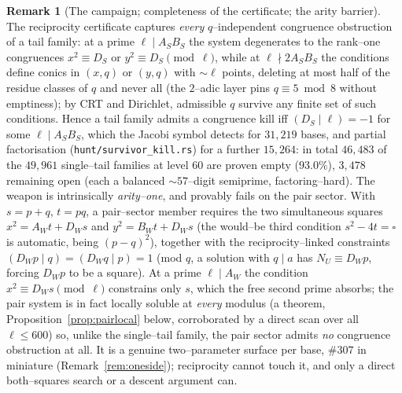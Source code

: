 \documentclass[11pt]{article}
\theoremstyle{definition}
\newtheorem{remark}[theorem]{Remark}
\begin{document}
\begin{remark}[The campaign; completeness of the certificate; the arity barrier]\label{rem:campaign}
The reciprocity certificate captures \emph{every} $q$--independent congruence obstruction of a
tail family: at a prime $\ell\mid A_SB_S$ the system degenerates to the rank--one congruences
$x^2\equiv D_S$ or $y^2\equiv D_S\pmod\ell$, while at $\ell\nmid 2A_SB_S$ the conditions define
conics in $(x,q)$ or $(y,q)$ with $\sim\ell$ points, deleting at most half of the residue classes
of $q$ and never all (the $2$--adic layer pins $q\equiv5\bmod8$ without emptiness); by CRT and
Dirichlet, admissible $q$ survive any finite set of such conditions. Hence a tail family admits a
congruence kill iff $(D_S\mid\ell)=-1$ for some $\ell\mid A_SB_S$, which the Jacobi symbol
detects for $31{,}219$ bases, and partial factorisation (\texttt{hunt/survivor\_kill.rs}) for a
further $15{,}264$: in total $46{,}483$ of the $49{,}961$ single--tail families at level $60$ are
proven empty ($93.0\%$), $3{,}478$ remaining open (each a balanced ${\sim}57$--digit semiprime, factoring--hard). The weapon is intrinsically \emph{arity--one}, and provably fails on the pair sector. With
$s=p+q$, $t=pq$, a pair--sector member requires the two simultaneous squares $x^2=A_Wt+D_Ws$ and
$y^2=B_Wt+D_Ws$ (the would--be third condition $s^2-4t=\square$ is automatic, being $(p-q)^2$),
together with the reciprocity--linked constraints $(D_Wp\mid q)=(D_Wq\mid p)=1$ (mod $q$, a
solution with $q\mid a$ has $N_U\equiv D_Wp$, forcing $D_Wp$ to be a square). At a prime
$\ell\mid A_W$ the condition $x^2\equiv D_Ws\pmod\ell$ constrains only $s$, which the free second
prime absorbs; the pair system is in fact locally soluble at \emph{every} modulus (a theorem,
Proposition~\ref{prop:pairlocal} below, corroborated by a direct scan over all $\ell\le600$) so,
unlike the single--tail family, the pair sector admits \emph{no} congruence obstruction at all. It
is a genuine two--parameter surface per base, $\#307$ in miniature (Remark~\ref{rem:oneside});
reciprocity cannot touch it, and only a direct both--squares search or a descent argument can.
\end{remark}
\end{document}
